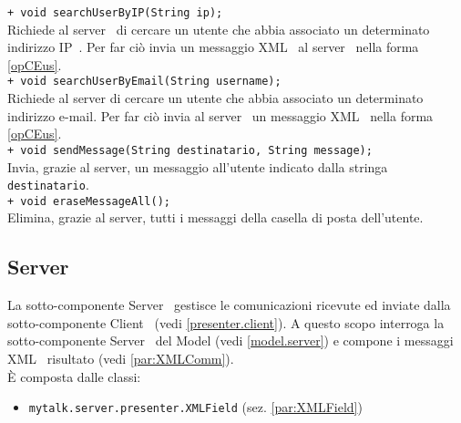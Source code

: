 {{\begin{sloppypar}
{{\begin{itemize}
{					\texttt{+ void searchUserByIP(String ip);}\\
					Richiede al server\g~ di cercare un utente che abbia associato un determinato indirizzo IP\g~. Per far ciò invia un messaggio XML\g~ al server\g~ nella forma \ref{opCEus}.\\

					\texttt{+ void searchUserByEmail(String username);}\\
					Richiede al server di cercare un utente che abbia associato un determinato indirizzo e-mail. Per far ciò invia al server\g~ un messaggio XML\g~ nella forma \ref{opCEus}.\\
					
					\texttt{+ void sendMessage(String destinatario, String message);}\\
					Invia, grazie al server, un messaggio all'utente indicato dalla stringa \texttt{destinatario}.\\
					 
					\texttt{+ void eraseMessageAll();}\\
					Elimina, grazie al server, tutti i messaggi della casella di posta dell'utente.\\	
				}
			\end{itemize}
			}

	}


	\subsection{Server}{\label{presenter.server}

	La sotto-componente Server\g~ gestisce le comunicazioni ricevute ed inviate dalla sotto-componente Client\g~ (vedi \ref{presenter.client}). A questo scopo interroga la sotto-componente Server\g~ del Model (vedi \ref{model.server}) e compone i messaggi XML\g~ risultato (vedi  \ref{par:XMLComm}).\\
	\`E composta dalle classi:
	\begin{itemize}
		\item[] \texttt{mytalk.server.presenter.XMLField} (sez. \ref{par:XMLField})\\


\end{itemize}}
\end{sloppypar}}}
